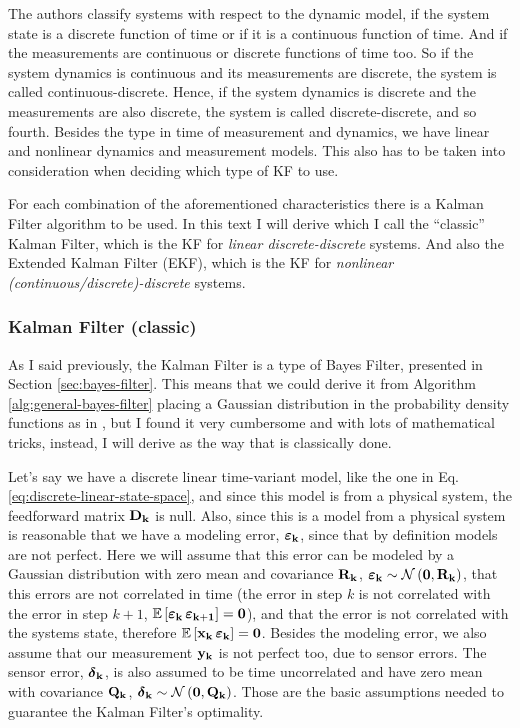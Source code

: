 \documentclass[12pt]{article}
\begin{document}
The authors classify systems with respect to the dynamic model, if the system state is a discrete function of time or if it is a continuous function of time. And if the measurements are continuous or discrete functions of time too. So if the system dynamics is continuous and its measurements are discrete, the system is called continuous-discrete. Hence, if the system dynamics is discrete and the measurements are also discrete, the system is called discrete-discrete, and so fourth. Besides the type in time of measurement and dynamics, we have linear and nonlinear dynamics and measurement models. This also has to be taken into consideration when deciding which type of KF to use.

For each combination of the aforementioned characteristics there is a Kalman Filter algorithm to be used. In this text I will derive which I call the ``classic'' Kalman Filter, which is the KF for \textit{linear discrete-discrete} systems. And also the Extended Kalman Filter (EKF), which is the KF for \textit{nonlinear (continuous/discrete)-discrete} systems.

\subsubsection{Kalman Filter (classic)}
As I said previously, the Kalman Filter is a type of Bayes Filter, presented in Section \ref{sec:bayes-filter}. This means that we could derive it from Algorithm \ref{alg:general-bayes-filter} placing a Gaussian distribution in the probability density functions as in \cite[p.~45]{bongard2006probabilistic}, but I found it very cumbersome and with lots of mathematical tricks, instead, I will derive as the way that is classically done. 

Let's say we have a discrete linear time-variant model, like the one in Eq. \ref{eq:discrete-linear-state-space}, and since this model is from a physical system, the feedforward matrix $\boldsymbol{\mathbf{D_k}}$ is null. Also, since this is a model from a physical system is reasonable that we have a modeling error, ${\boldsymbol{\varepsilon}}_\mathbf{k}$, since that by definition models are not perfect. Here we will assume that this error can be modeled by a Gaussian distribution with zero mean and covariance $\boldsymbol{\mathbf{R_k}}$, ${\boldsymbol{\varepsilon}}_\mathbf{k} \sim \mathcal{N}\left(\boldsymbol{\mathbf{0}}, \boldsymbol{\mathbf{R_k}}\right)$, that this errors are not correlated in time (the error in step $k$ is not correlated with the error in step $k+1$, $\mathbb{E}\left[{\boldsymbol{\varepsilon}}_\mathbf{k} \, {\boldsymbol{\varepsilon}}_\mathbf{k+1}\right] = \boldsymbol{\mathbf{0}}$), and that the error is not correlated with the systems state, therefore $\mathbb{E}\left[\boldsymbol{\mathbf{x_k}} \, {\boldsymbol{\varepsilon}}_\mathbf{k}\right] = \boldsymbol{\mathbf{0}}$. Besides the modeling error, we also assume that our measurement $\boldsymbol{\mathbf{y_k}}$ is not perfect too, due to sensor errors. The sensor error, ${\boldsymbol{\delta}}_\mathbf{k}$, is also assumed to be time uncorrelated and have zero mean with covariance $\boldsymbol{\mathbf{Q_k}}$, ${\boldsymbol{\delta}}_\mathbf{k} \sim \mathcal{N}\left(\boldsymbol{\mathbf{0}}, \boldsymbol{\mathbf{Q_k}}\right)$.
Those are the basic assumptions needed to guarantee the Kalman Filter's optimality.
\end{document}
